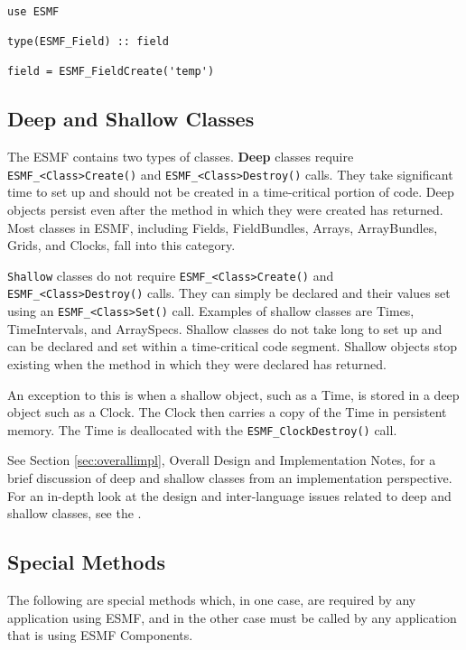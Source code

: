 \begin{verbatim}

use ESMF

type(ESMF_Field) :: field

field = ESMF_FieldCreate('temp')

\end{verbatim}

\subsection{Deep and Shallow Classes}
\label{sec:deepshallow}

The ESMF contains two types of classes.  {\bf Deep} classes require
{\tt ESMF\_<Class>Create()} and {\tt ESMF\_<Class>Destroy()} calls.
They take significant time to set up and should not be created
in a time-critical portion of code.  Deep objects persist 
even after the method in which they were created has returned.
Most classes in ESMF, including Fields, FieldBundles, Arrays,
ArrayBundles, Grids, and Clocks, fall into this category.

{\tt Shallow} classes do not require {\tt ESMF\_<Class>Create()}
 and {\tt ESMF\_<Class>Destroy()} calls.  They can simply be declared
and their values set using an {\tt ESMF\_<Class>Set()} call.  
Examples of shallow classes are Times, TimeIntervals, and 
ArraySpecs.  Shallow classes do not take long to set up and can
be declared and set within
a time-critical code segment.  Shallow objects stop existing when
the method in which they were declared has returned.  

An exception to this is when a shallow object, such as a Time, 
is stored in a deep object such as a Clock.  The Clock then
carries a copy of the Time in persistent memory.  The Time is
deallocated with the {\tt ESMF\_ClockDestroy()} call.

See Section \ref{sec:overallimpl}, Overall Design and Implementation 
Notes, for a brief discussion of deep and shallow classes from 
an implementation perspective.  For an in-depth look at the design 
and inter-language issues related to deep and shallow classes,
see the .

\subsection{Special Methods}

The following are special methods which, in one case,
are required by any application using ESMF, and in the 
other case must be called by any application that is using 
ESMF Components.

